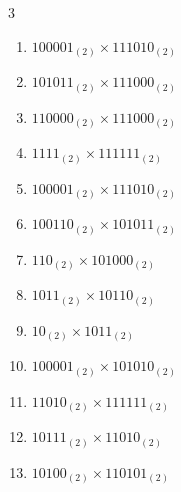 \begin{multicols}{3}
\begin{enumerate}
  \item $100001_{(2)} \times 111010_{(2)}$


  \item $101011_{(2)} \times 111000_{(2)}$


  \item $110000_{(2)} \times 111000_{(2)}$


  \item $1111_{(2)} \times 111111_{(2)}$


  \item $100001_{(2)} \times 111010_{(2)}$


\columnbreak %

\resetques

  \item $100110_{(2)} \times 101011_{(2)}$


  \item $110_{(2)} \times 101000_{(2)}$


  \item $1011_{(2)} \times 10110_{(2)}$


  \item $10_{(2)} \times 1011_{(2)}$


  \item $100001_{(2)} \times 101010_{(2)}$


\columnbreak %

  \item $11010_{(2)} \times 111111_{(2)}$


  \item $10111_{(2)} \times 11010_{(2)}$


  \item $10100_{(2)} \times 110101_{(2)}$


\end{enumerate}
\end{multicols}
